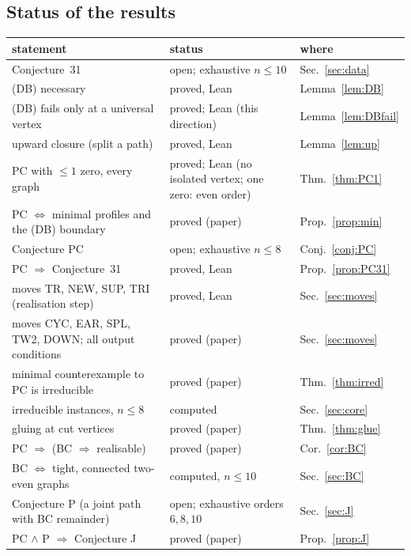 \documentclass[11pt]{amsart}
\theoremstyle{definition}
\begin{document}
\subsection*{Status of the results}
\begin{center}\footnotesize
\begin{tabular}{@{}p{}p{}p{}@{}}
\toprule
statement & status & where\\
\midrule
Conjecture~31 & open; exhaustive $n\le10$ & Sec.~\ref{sec:data}\\
(DB) necessary & proved, Lean & Lemma~\ref{lem:DB}\\
(DB) fails only at a universal vertex & proved; Lean (this direction) & Lemma~\ref{lem:DBfail}\\
upward closure (split a path) & proved, Lean & Lemma~\ref{lem:up}\\
PC with $\le1$ zero, every graph & proved; Lean (no isolated vertex; one zero: even order) & Thm.~\ref{thm:PC1}\\
PC $\Leftrightarrow$ minimal profiles and the (DB) boundary & proved (paper) & Prop.~\ref{prop:min}\\
Conjecture PC & open; exhaustive $n\le 8$ & Conj.~\ref{conj:PC}\\
PC $\Rightarrow$ Conjecture~31 & proved, Lean & Prop.~\ref{prop:PC31}\\
moves TR, NEW, SUP, TRI (realisation step) & proved, Lean & Sec.~\ref{sec:moves}\\
moves CYC, EAR, SPL, TW2, DOWN; all output conditions & proved (paper) & Sec.~\ref{sec:moves}\\
minimal counterexample to PC is irreducible & proved (paper) & Thm.~\ref{thm:irred}\\
irreducible instances, $n\le8$ & computed & Sec.~\ref{sec:core}\\
gluing at cut vertices & proved (paper) & Thm.~\ref{thm:glue}\\
PC $\Rightarrow$ (BC $\Rightarrow$ realisable) & proved (paper) & Cor.~\ref{cor:BC}\\
BC $\Leftrightarrow$ tight, connected two-even graphs & computed, $n\le 10$ & Sec.~\ref{sec:BC}\\
Conjecture P (a joint path with BC remainder) & open; exhaustive orders $6,8,10$ & Sec.~\ref{sec:J}\\
PC $\wedge$ P $\Rightarrow$ Conjecture J & proved (paper) & Prop.~\ref{prop:J}\\
\bottomrule
\end{tabular}
\end{center}
\end{document}
